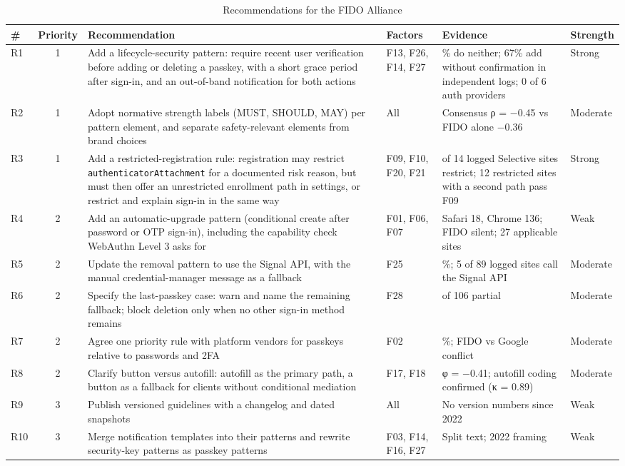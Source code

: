 \documentclass[letterpaper,twocolumn,10pt]{article}
\begin{document}
\begin{table}[t]\centering\scriptsize\setlength{\tabcolsep}{3pt}\caption{Recommendations for the FIDO Alliance}\label{tab:8}
\begin{tabularx}{\textwidth}{lc>{\raggedright\arraybackslash}X>{\raggedright\arraybackslash}p{2.0cm}>{\raggedright\arraybackslash}p{3.6cm}>{\raggedright\arraybackslash}p{1.3cm}}\toprule
\textbf{\#} & \textbf{Priority} & \textbf{Recommendation} & \textbf{Factors} & \textbf{Evidence} & \textbf{Strength} \\ \midrule
R1 & 1 & Add a lifecycle-security pattern: require recent user verification before adding or deleting a passkey, with a short grace period after sign-in, and an out-of-band notification for both actions & F13, F26, F14, F27 & 65\% do neither; 67\% add without confirmation in independent logs; 0 of 6 auth providers & Strong \\
R2 & 1 & Adopt normative strength labels (MUST, SHOULD, MAY) per pattern element, and separate safety-relevant elements from brand choices & All & Consensus ρ = −0.45 vs FIDO alone −0.36 & Moderate \\
R3 & 1 & Add a restricted-registration rule: registration may restrict \texttt{authenticatorAttachment} for a documented risk reason, but must then offer an unrestricted enrollment path in settings, or restrict and explain sign-in in the same way & F09, F10, F20, F21 & 13 of 14 logged Selective sites restrict; 12 restricted sites with a second path pass F09 & Strong \\
R4 & 2 & Add an automatic-upgrade pattern (conditional create after password or OTP sign-in), including the capability check WebAuthn Level 3 asks for & F01, F06, F07 & Safari 18, Chrome 136; FIDO silent; 27 applicable sites & Weak \\
R5 & 2 & Update the removal pattern to use the Signal API, with the manual credential-manager message as a fallback & F25 & 23\%; 5 of 89 logged sites call the Signal API & Moderate \\
R6 & 2 & Specify the last-passkey case: warn and name the remaining fallback; block deletion only when no other sign-in method remains & F28 & 83 of 106 partial & Moderate \\
R7 & 2 & Agree one priority rule with platform vendors for passkeys relative to passwords and 2FA & F02 & 36\%; FIDO vs Google conflict & Moderate \\
R8 & 2 & Clarify button versus autofill: autofill as the primary path, a button as a fallback for clients without conditional mediation & F17, F18 & φ = −0.41; autofill coding confirmed (κ = 0.89) & Moderate \\
R9 & 3 & Publish versioned guidelines with a changelog and dated snapshots & All & No version numbers since 2022 & Weak \\
R10 & 3 & Merge notification templates into their patterns and rewrite security-key patterns as passkey patterns & F03, F14, F16, F27 & Split text; 2022 framing & Weak \\
\bottomrule\end{tabularx}\end{table}
\end{document}
